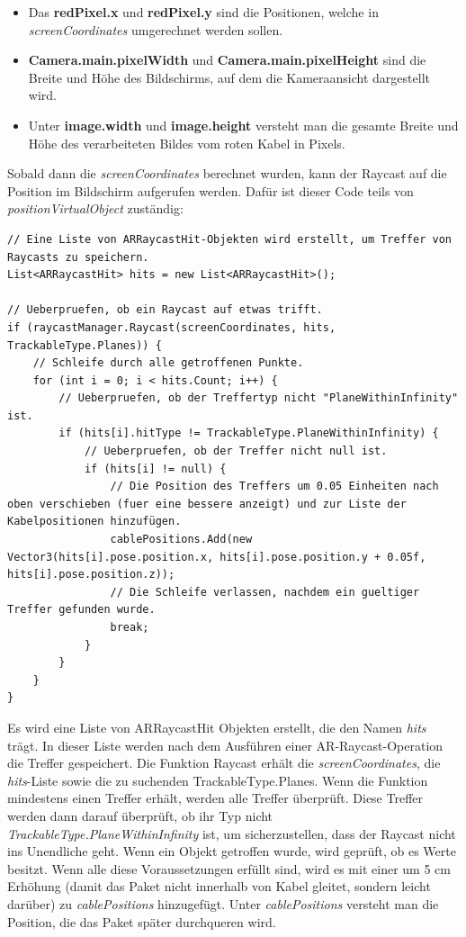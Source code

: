 \begin{itemize}
    \item Das \textbf{redPixel.x} und \textbf{redPixel.y} sind die Positionen, welche in \textit{screenCoordinates} umgerechnet werden sollen.
    \item \textbf{Camera.main.pixelWidth} und \textbf{Camera.main.pixelHeight} sind die Breite und Höhe des Bildschirms, auf dem die Kameraansicht dargestellt wird.
    \item Unter \textbf{image.width} und \textbf{image.height} versteht man die gesamte Breite und Höhe des verarbeiteten Bildes vom roten Kabel in Pixels.
\end{itemize}
Sobald dann die \textit{screenCoordinates} berechnet wurden, kann der Raycast auf die Position im Bildschirm aufgerufen werden. Dafür ist dieser Code teils von \textit{positionVirtualObject} zuständig:
\begin{lstlisting}[style=csharp, caption={Raycast schießen}, label=code:createRaycast]
// Eine Liste von ARRaycastHit-Objekten wird erstellt, um Treffer von Raycasts zu speichern.
List<ARRaycastHit> hits = new List<ARRaycastHit>();

// Ueberpruefen, ob ein Raycast auf etwas trifft.
if (raycastManager.Raycast(screenCoordinates, hits, TrackableType.Planes)) {
    // Schleife durch alle getroffenen Punkte.
    for (int i = 0; i < hits.Count; i++) {
        // Ueberpruefen, ob der Treffertyp nicht "PlaneWithinInfinity" ist.
        if (hits[i].hitType != TrackableType.PlaneWithinInfinity) {
            // Ueberpruefen, ob der Treffer nicht null ist.
            if (hits[i] != null) {
                // Die Position des Treffers um 0.05 Einheiten nach oben verschieben (fuer eine bessere anzeigt) und zur Liste der Kabelpositionen hinzufügen.
                cablePositions.Add(new Vector3(hits[i].pose.position.x, hits[i].pose.position.y + 0.05f, hits[i].pose.position.z));
                // Die Schleife verlassen, nachdem ein gueltiger Treffer gefunden wurde.
                break;
            }
        }
    }
}

\end{lstlisting}
Es wird eine Liste von ARRaycastHit Objekten erstellt, die den Namen \textit{hits} trägt. In dieser Liste werden nach dem Ausführen einer AR-Raycast-Operation die Treffer gespeichert. Die Funktion Raycast erhält die \textit{screenCoordinates}, die \textit{hits}-Liste sowie die zu suchenden TrackableType.Planes.
Wenn die Funktion mindestens einen Treffer erhält, werden alle Treffer überprüft. Diese Treffer werden dann darauf überprüft, ob ihr Typ nicht \textit{TrackableType.PlaneWithinInfinity} ist, um sicherzustellen, dass der Raycast nicht ins Unendliche geht. Wenn ein Objekt getroffen wurde, wird geprüft, ob es Werte besitzt. Wenn alle diese Voraussetzungen erfüllt sind, wird es mit einer um 5 cm Erhöhung (damit das Paket nicht innerhalb von Kabel gleitet, sondern leicht darüber) zu \textit{cablePositions} hinzugefügt. Unter \textit{cablePositions} versteht man die Position, die das Paket später durchqueren wird.


